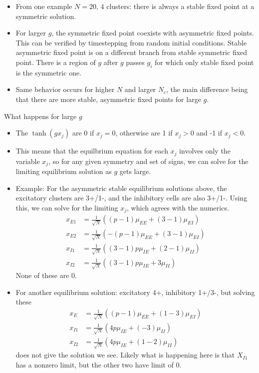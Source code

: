 \documentclass[11pt,reqno]{amsart}
\begin{document}
\begin{itemize}
    \item From one example $N = 20$, 4 clusters: there is always a stable fixed point at a symmetric solution.
    
    \item For larger $g$, the symmetric fixed point coexists with asymmetric fixed points. This can be verified by timestepping from random initial conditions. Stable asymmetric fixed point is on a different branch from stable symmetric fixed point. There is a region of $g$ after $g$ passes $g_i$ for which only stable fixed point is the symmetric one.
    
    \item Same behavior occurs for higher $N$ and larger $N_c$, the main difference being that there are more stable, asymmetric fixed points for large $g$.
\end{itemize}

What happens for large $g$
\begin{itemize}
    \item The $\tanh(g x_j)$ are 0 if $x_j = 0$, otherwise are 1 if $x_j > 0$ and -1 if $x_j < 0$.
    \item This means that the equilbrium equation for each $x_j$ involves only the variable $x_j$, so for any given symmetry and set of signs, we can solve for the limiting equilibrium solution as $g$ gets large.
    \item Example: For the asymmetric stable equilibrium solutions above, the excitatory clusters are 3+/1-, and the inhibitory cells are also 3+/1-. Using this, we can solve for the limiting $x_j$, which agrees with the numerics.
    \begin{align*}
        x_{E1} &= \frac{1}{\sqrt{N}}\left( (p-1)\mu_{EE} + (3-1) \mu_{EI} \right) \\
        x_{E2} &= \frac{1}{\sqrt{N}}\left( -(p-1)\mu_{EE} + (3-1) \mu_{EI} \right) \\
        x_{I1} &= \frac{1}{\sqrt{N}}\left( (3-1)p\mu_{IE} + (2-1) \mu_{II} \right) \\
        x_{I2} &= \frac{1}{\sqrt{N}}\left( (3-1)p\mu_{IE} + 3 \mu_{II} \right) 
    \end{align*}
    None of these are 0.
    
    \item For another equilibrium solution: excitatory 4+, inhibitory 1+/3-, but solving these
        \begin{align*}
        x_{E} &= \frac{1}{\sqrt{N}}\left( (p-1)\mu_{EE} + (1-3) \mu_{EI} \right) \\
        x_{I1} &= \frac{1}{\sqrt{N}}\left( 4 p\mu_{IE} + (-3) \mu_{II} \right) \\
        x_{I2} &= \frac{1}{\sqrt{N}}\left( 4 p\mu_{IE} + (1-2) \mu_{II} \right) 
    \end{align*}
    does not give the solution we see. Likely what is happening here is that $X_{I1}$ has a nonzero limit, but the other two have limit of 0.
    
\end{itemize}
\end{document}
